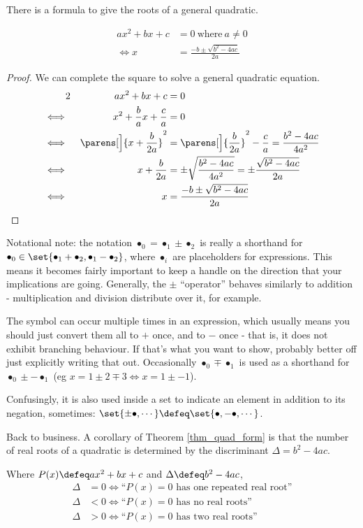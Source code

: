 There is a formula to give the roots of a general quadratic.
\begin{theorem}
 \label{thm_quad_form}
 \begin{align*}
  ax^2 + bx + c &= 0\ \text{where}\ a \neq 0 \\
  \iff x &= \frac{-b \pm \sqrt{b^2 - 4ac}}{2a}
 \end{align*}
\end{theorem}
\begin{proof}
 We can complete the square to solve a general quadratic equation.
 \begin{alignat*}2
  &&ax^2 + bx + c &= 0 \\
  \iff{}&& x^2 + \frac ba x + \frac ca &= 0 \\
  \iff{}&& \parens[\Big]{x + \frac b{2a}}^2
      &= \parens[\Big]{\frac b{2a}}^2 - \frac ca
      = \frac{b^2 - 4ac}{4a^2} \\
  \iff{}&& x + \frac b{2a} &= \pm \sqrt{\frac{b^2 - 4ac}{4a^2}}
      = \pm \frac{\sqrt{b^2 - 4ac}}{2a} \\
  \iff{}&& x &= \frac{-b \pm \sqrt{b^2 - 4ac}}{2a} \qedhere
 \end{alignat*}
\end{proof}
Notational note: the notation \(\bullet_0 = \bullet_1 \pm \bullet_2\) is really
a shorthand for
\(\bullet_0 \in \set{\bullet_1 + \bullet_2, \bullet_1 - \bullet_2}\), where
\(\bullet_i\) are placeholders for expressions. This means it becomes fairly
important to keep a handle on the direction that your implications are going.
Generally, the \(\pm\) ``operator'' behaves similarly to addition -
multiplication and division distribute over it, for example.

The symbol can occur multiple times in an expression, which usually means you
should just convert them all to \(+\) once, and to \(-\) once - that is, it does
not exhibit branching behaviour. If that's what you want to show, probably
better off just explicitly writing that out. Occasionally
\(\bullet_0 \mp \bullet_1\) is used as a shorthand for
\(\bullet_0 \pm -\bullet_1\)
(eg \(x = 1 \pm 2 \mp 3 \iff x = 1 \pm -1\)).

Confusingly, it is also used inside a set to indicate an element in addition to
its negation, sometimes:
\(\set{\pm \bullet, \cdots} \defeq \set{\bullet, -\bullet, \cdots}\).

Back to business. A corollary of Theorem \ref{thm_quad_form} is that the number
of real roots of a quadratic is
determined by the discriminant \({\Delta = b^2 - 4ac}\).
\begin{corollary}
 Where \(P(x) \defeq ax^2 + bx + c\) and \(\Delta \defeq b^2 - 4ac\),
 \begin{align*}
  \Delta &= 0 \iff \text{``\(P(x) = 0\) has one repeated real root''} \\
  \Delta &< 0 \iff \text{``\(P(x) = 0\) has no real roots''} \\
  \Delta &> 0 \iff \text{``\(P(x) = 0\) has two real roots''}
 \end{align*}
\end{corollary}

